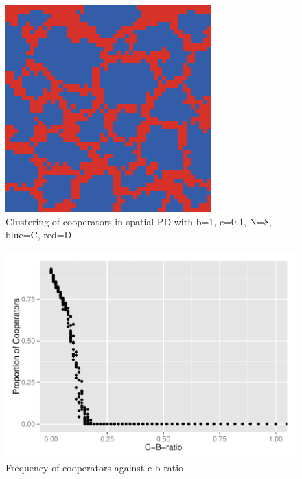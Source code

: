 \documentclass[DIV=calc, paper=a4, fontsize=11pt, twocolumn]{scrartcl}	 %
\begin{document}
\begin{figure}[here]
\centering
\begin{minipage}{.35\textwidth}
  \centering
  \includegraphics[width=1\linewidth]{PDspatial8cost01}
 \caption{Clustering of cooperators in spatial PD with b=1, c=0.1, N=8, blue=C, red=D}
\label{fig:PDspatialcluster}
\end{minipage}%
\end{figure}

\begin{figure}
\begin{minipage}{.48\textwidth}
  \centering
  \includegraphics[width=1\linewidth]{spatialPDratio}
 \caption{Frequency of cooperators against c-b-ratio}
  \label{fig:PDspatialfreq}
\end{minipage}
\end{figure}
\end{document}
